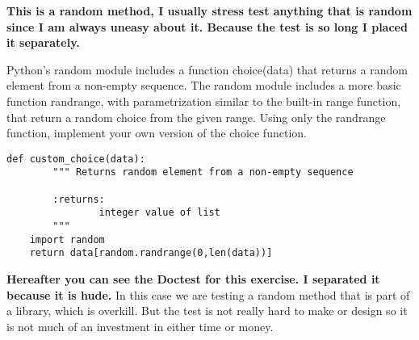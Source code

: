  \label{sssec:ex1_12}

\textbf{This is a random method, I usually stress test anything that is random since I am always uneasy about it. Because the test is so long I placed it separately.}

Python's random module includes a function choice(data) that returns a random element from a non-empty sequence. The random module includes a more basic function randrange, with parametrization similar to the built-in range function, that return a random choice from the given range. Using only the randrange function, implement your own version of the choice function.


\begin{lstlisting}[title=Exercise R-1.12]
def custom_choice(data):
		""" Returns random element from a non-empty sequence
		
		:returns:
				integer value of list
		"""
    import random
    return data[random.randrange(0,len(data))]
\end{lstlisting}


\textbf{Hereafter you can see the Doctest for this exercise. I separated it because it is hude.} In this case we are testing a random method that is part of a library, which is overkill. But the test is not really hard to make or design so it is not much of an investment in either time or money. 

